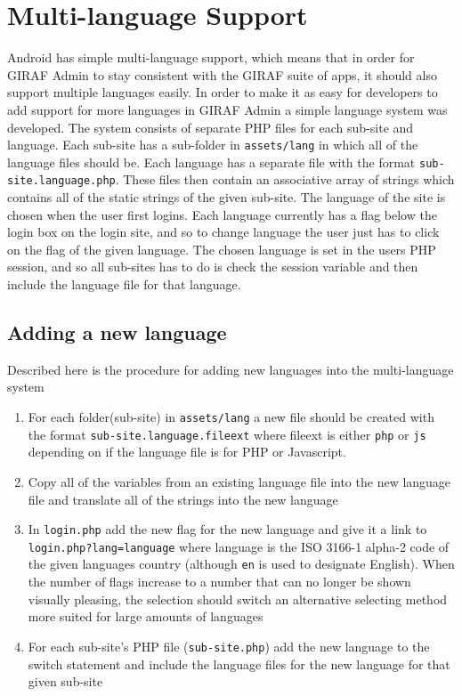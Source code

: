 \section{Multi-language Support}
Android has simple multi-language support, which means that in order for GIRAF Admin to stay consistent with the GIRAF suite of apps, it should also support multiple languages easily. In order to make it as easy for developers to add support for more languages in GIRAF Admin a simple language system was developed. The system consists of separate PHP files for each sub-site and language. Each sub-site has a sub-folder in \texttt{assets/lang} in which all of the language files should be. Each language has a separate file with the format \texttt{sub-site.language.php}. These files then contain an associative array of strings which contains all of the static strings of the given sub-site. The language of the site is chosen when the user first logins. Each language currently has a flag below the login box on the login site, and so to change language the user just has to click on the flag of the given language. The chosen language is set in the users PHP session, and so all sub-sites has to do is check the session variable and then include the language file for that language. \\

\subsection{Adding a new language}
Described here is the procedure for adding new languages into the multi-language system
\begin{enumerate}
\item For each folder(sub-site) in \texttt{assets/lang} a new file should be created with the format \texttt{sub-site.language.fileext} where fileext is either \texttt{php} or \texttt{js} depending on if the language file is for PHP or Javascript.
\item Copy all of the variables from an existing language file into the new language file and translate all of the strings into the new language
\item In \texttt{login.php} add the new flag for the new language and give it a link to \texttt{login.php?lang=language} where language is the ISO 3166-1 alpha-2 code of the given languages country (although \texttt{en} is used to designate English). When the number of flags increase to a number that can no longer be shown visually pleasing, the selection should switch an alternative selecting method more suited for large amounts of languages
\item For each sub-site's PHP file (\texttt{sub-site.php}) add the new language to the switch statement and include the language files for the new language for that given sub-site
\end{enumerate}

